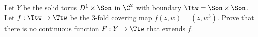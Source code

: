 Let $Y$ be the solid torus $D^1\times \Son$ in $\C^2$ with boundary
$\Ttw=\Son\times \Son$. Let $f:\Ttw\rightarrow \Ttw$ be the $3$-fold
covering map $f(z,w)=(z,w^3)$. Prove that there is no continuous
function $F:Y\rightarrow \Ttw$ that extends $f$.
